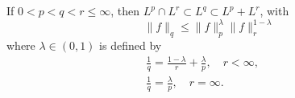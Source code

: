 %
%
%
%
\begin{lemma}
\label{lem:simp-riesz-thorin}
If $0 < p < q < r \le \infty$, then $L^{p} \cap L^{r} \subset L^{q} \subset
L^{p} + L^{r}$, with
%
%
\begin{equation}
\label{embed-relation}
\| f \|_{q} \le \| f \|_{p}^{\lambda} \| f \|_{r}^{1-\lambda}
\end{equation}
%
%
where $\lambda \in (0,1)$ is defined by
%
%
\begin{align}
\label{embed-param-fin}
& \frac{1}{q} = \frac{1-\lambda}{r} + \frac{\lambda}{p}, \quad r < \infty, \qquad
\\
\label{embed-param-infty}
& \frac{1}{q} = \frac{\lambda}{p}, \quad r = \infty.
\end{align}
%
%
\end{lemma}
%
